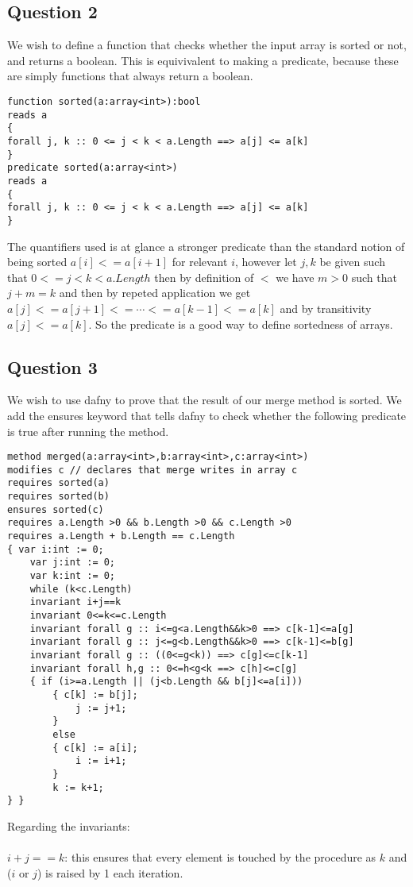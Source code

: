 \documentclass{article}
\theoremstyle{remark}
\begin{document}
\subsection{Question 2}
We wish to define a function that checks whether the input array is sorted or not, and returns a boolean. This is equivivalent to making a predicate, because these are simply functions that always return a boolean.
\begin{lstlisting}
function sorted(a:array<int>):bool
reads a
{
forall j, k :: 0 <= j < k < a.Length ==> a[j] <= a[k]
}
predicate sorted(a:array<int>)
reads a
{
forall j, k :: 0 <= j < k < a.Length ==> a[j] <= a[k]
}
\end{lstlisting}
The quantifiers used is at glance a stronger predicate than the standard notion of being sorted $a[i]<=a[i+1]$ for relevant $i$, however let $j,k$ be given such that $0<=j<k<a.Length$ then by definition of $<$ we have $m>0$ such that $j+m=k$ and then by repeted application we get $a[j]<=a[j+1]<=\cdots<=a[k-1]<=a[k]$ and by transitivity $a[j]<=a[k]$. So the predicate is a good way to define sortedness of arrays.
\newpage\subsection{Question 3}
We wish to use dafny to prove that the result of our merge method is sorted. We add the ensures keyword that tells dafny to check whether the following predicate is true after running the method. 
\begin{lstlisting}
method merged(a:array<int>,b:array<int>,c:array<int>)
modifies c // declares that merge writes in array c
requires sorted(a)
requires sorted(b)
ensures sorted(c)
requires a.Length >0 && b.Length >0 && c.Length >0
requires a.Length + b.Length == c.Length
{ var i:int := 0;
	var j:int := 0;
	var k:int := 0;
	while (k<c.Length)
	invariant i+j==k
	invariant 0<=k<=c.Length
	invariant forall g :: i<=g<a.Length&&k>0 ==> c[k-1]<=a[g]
	invariant forall g :: j<=g<b.Length&&k>0 ==> c[k-1]<=b[g]
	invariant forall g :: ((0<=g<k)) ==> c[g]<=c[k-1]
	invariant forall h,g :: 0<=h<g<k ==> c[h]<=c[g]
	{ if (i>=a.Length || (j<b.Length && b[j]<=a[i]))
		{ c[k] := b[j];
			j := j+1;
		}
		else
		{ c[k] := a[i];
			i := i+1;
		}
		k := k+1;
} }
\end{lstlisting}
Regarding the invariants:\\\\
$i+j==k$: this ensures that every element is touched by the procedure as $k$ and ($i$ or $j$) is raised by 1 each iteration.\\\\
\end{document}
